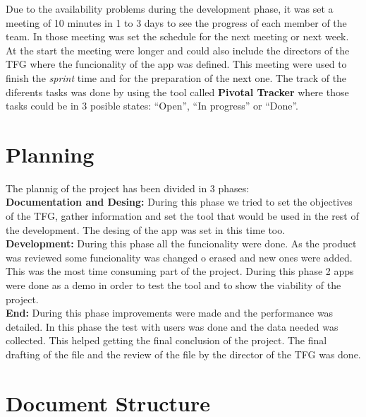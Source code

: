 Due to the availability problems during the development phase, it was set a meeting of 10 minutes in 1 to 3 days to see the progress of each member of the team. In those meeting was set the schedule for the next meeting or next week. At the start the meeting were longer and could also include the directors of the TFG where the funcionality of the app was defined. This meeting were used to finish the \textit{sprint} time and for the preparation of the next one. The track of the diferents tasks was done by using the tool called \textbf{Pivotal Tracker} where those tasks could be in 3 posible states: ``Open'', ``In progress'' or ``Done''.\\

\section*{Planning}



The plannig of the project has been divided in 3 phases:\\

\textbf{Documentation and Desing:} During this phase we tried to set the objectives of the TFG, gather information and set the tool that would be used in the rest of the development. The desing of the app was set in this time too.\\

\textbf{Development:} During this phase all the funcionality were done. As the product was reviewed some funcionality was changed o erased and new ones were added. This was the most time consuming part of the project. During this phase 2 apps were done as a demo in order to test the tool and to show the viability of the project.\\

\textbf{End:} During this phase improvements were made and the performance was detailed. In this phase the test with users was done and the data needed was collected. This helped getting the final conclusion of the project. The final drafting of the file and the review of the file by the director of the TFG was done.\\

\section*{Document Structure}


